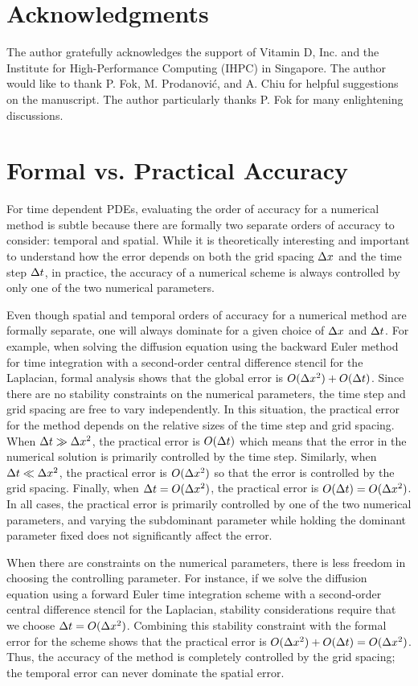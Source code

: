 \documentclass[fleqn,12pt,twoside]{article}
\begin{document}
\section*{Acknowledgments}
The author gratefully acknowledges the support of Vitamin D, Inc.
and the Institute for High-Performance Computing (IHPC) in Singapore. 
The author would like to thank P. Fok, M. Prodanovi\'c, and A. Chiu for 
helpful suggestions on the manuscript.  The author particularly thanks P. Fok 
for many enlightening discussions. 


\appendix
\section{Formal vs. Practical Accuracy
         \label{app:formal_vs_practical_accuracy} }
For time dependent PDEs, evaluating the order of accuracy for a numerical
method is subtle because there are formally two separate orders of accuracy 
to consider:  temporal and spatial.  While it is theoretically
interesting and important to understand how the error depends on both the 
grid spacing $\Delta x$ and the time step $\Delta t$, in practice, the accuracy 
of a numerical scheme is always controlled by only one of the two numerical
parameters.  

Even though spatial and temporal orders of accuracy for a numerical method
are formally separate, one will always dominate for a given choice of 
$\Delta x$ and $\Delta t$.  For example, when solving the diffusion equation 
using the backward Euler method for time integration with a second-order 
central difference stencil for the Laplacian, formal analysis shows that 
the global error is $O(\Delta x^2) + O(\Delta t)$.  Since there are no 
stability constraints on the numerical parameters, the time
step and grid spacing are free to vary independently.  In this situation, the 
practical error for the method depends on the relative sizes of the time step 
and grid spacing.  When $\Delta t \gg \Delta x^2$, the practical error is 
$O(\Delta t)$ which means that the error in the numerical solution is 
primarily controlled by the time step.  Similarly, when 
$\Delta t \ll \Delta x^2$, the practical error is $O(\Delta x^2)$ so that 
the error is controlled by the grid spacing.  Finally, when 
$\Delta t  = O(\Delta x^2)$, the practical error is 
$O(\Delta t) = O(\Delta x^2)$.  In all cases, the practical error is 
primarily controlled by one of the two numerical parameters, and varying
the subdominant parameter while holding the dominant parameter fixed does 
not significantly affect the error.
 
When there are constraints on the numerical parameters, there is less freedom 
in choosing the controlling parameter.  For instance, if we solve the 
diffusion equation using a forward Euler time integration scheme with a 
second-order central difference stencil for the Laplacian, stability
considerations require that we choose $\Delta t = O(\Delta x^2)$.  
Combining this stability constraint with the formal error for the scheme
shows that the practical error is 
$O(\Delta x^2) + O(\Delta t) = O(\Delta x^2)$.  Thus, the accuracy of the 
method is completely controlled by the grid spacing; the temporal error can 
never dominate the spatial error.


\end{document}
